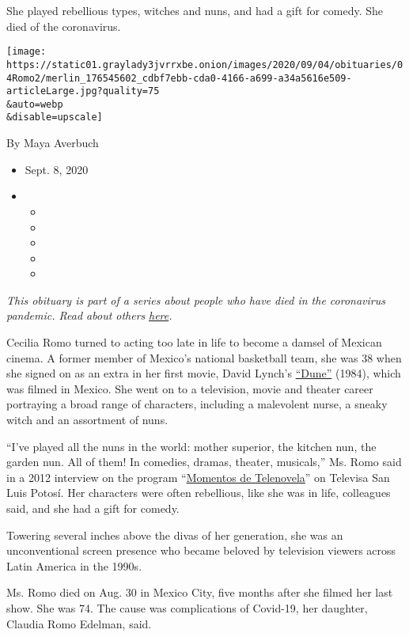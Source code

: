She played rebellious types, witches and nuns, and had a gift for
comedy. She died of the coronavirus.

\texttt{[image: https://static01.graylady3jvrrxbe.onion/images/2020/09/04/obituaries/04Romo2/merlin\_176545602\_cdbf7ebb-cda0-4166-a699-a34a5616e509-articleLarge.jpg?quality=75\\\&auto=webp\\\&disable=upscale]}

By Maya Averbuch

\begin{itemize}
\item
  Sept. 8, 2020
\item
  \begin{itemize}
  \item
  \item
  \item
  \item
  \item
  \end{itemize}
\end{itemize}

\emph{This obituary is part of a series about people who have died in
the coronavirus pandemic. Read about others}
\href{https://www.nytimes3xbfgragh.onion/interactive/2020/obituaries/people-died-coronavirus-obituaries.html}{\emph{here}}\emph{.}

Cecilia Romo turned to acting too late in life to become a damsel of
Mexican cinema. A former member of Mexico's national basketball team,
she was 38 when she signed on as an extra in her first movie, David
Lynch's
\href{https://www.nytimes3xbfgragh.onion/1983/09/04/movies/the-world-of-dune-is-filmed-in-mexico.html}{``Dune''}
(1984), which was filmed in Mexico. She went on to a television, movie
and theater career portraying a broad range of characters, including a
malevolent nurse, a sneaky witch and an assortment of nuns.

``I've played all the nuns in the world: mother superior, the kitchen
nun, the garden nun. All of them! In comedies, dramas, theater,
musicals,'' Ms. Romo said in a 2012 interview on the program
``\href{https://www.youtube.com/watch?v=DKN38WobMtE}{Momentos de
Telenovela}'' on Televisa San Luis Potosí. Her characters were often
rebellious, like she was in life, colleagues said, and she had a gift
for comedy.

Towering several inches above the divas of her generation, she was an
unconventional screen presence who became beloved by television viewers
across Latin America in the 1990s.

Ms. Romo died on Aug. 30 in Mexico City, five months after she filmed
her last show. She was 74. The cause was complications of Covid-19, her
daughter, Claudia Romo Edelman, said.

